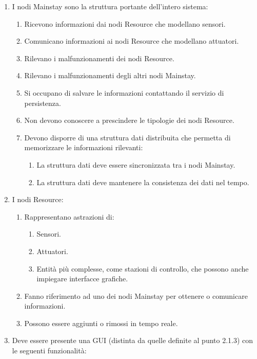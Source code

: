 \documentclass[12pt]{article}
\begin{document}
\begin{enumerate}
    \item I nodi Mainstay sono la struttura portante dell'intero sistema:
    \begin{enumerate}
        \item Ricevono informazioni dai nodi Resource che modellano sensori.
        \item Comunicano informazioni ai nodi Resource che modellano attuatori.
        \item Rilevano i malfunzionamenti dei nodi Resource.
        \item Rilevano i malfunzionamenti degli altri nodi Mainstay.
        \item Si occupano di salvare le informazioni contattando il servizio di persistenza.
        \item Non devono conoscere a prescindere le tipologie dei nodi Resource.
        \item Devono disporre di una struttura dati distribuita che permetta di memorizzare le informazioni rilevanti:
        \begin{enumerate}
            \item La struttura dati deve essere sincronizzata tra i nodi Mainstay.
            \item La struttura dati deve mantenere la consistenza dei dati nel tempo.
        \end{enumerate}
    \end{enumerate}
    \item I nodi Resource:
    \begin{enumerate}
        \item Rappresentano astrazioni di:
        \begin{enumerate}
            \item Sensori.
            \item Attuatori.
            \item Entità più complesse, come stazioni di controllo, che possono anche impiegare interfacce grafiche.
        \end{enumerate}
        \item Fanno riferimento ad uno dei nodi Mainstay per ottenere o comunicare informazioni.
        \item Possono essere aggiunti o rimossi in tempo reale.
    \end{enumerate}
    \item Deve essere presente una GUI (distinta da quelle definite al punto 2.1.3) con le seguenti funzionalità:

\end{enumerate}
\end{document}

